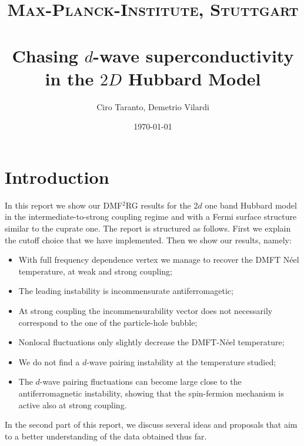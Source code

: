 \documentclass[paper=a4, fontsize=11pt]{scrartcl} %
\title{	
\normalfont \normalsize 
\textsc{Max-Planck-Institute, Stuttgart} \\ [25pt] %
\horrule{0.5pt} \\[0.4cm] %
\huge Chasing $d$-wave superconductivity \\
in the $2D$ Hubbard Model %
\horrule{2pt} \\[0.5cm] %
}
\author{Ciro Taranto, Demetrio Vilardi} %
\date{\normalsize\today} %
\numberwithin{equation}{section} %
\numberwithin{figure}{section} %
\numberwithin{table}{section} %
\begin{document}
\maketitle %


\section{Introduction}
In this report we show our DMF$^2$RG results for the  2$d$ one band Hubbard model in the intermediate-to-strong coupling regime and with a Fermi surface structure similar to the cuprate one. 
The report is structured as follows. 
First we explain the cutoff choice that we have implemented. 
Then we show our results, namely: 
\begin{itemize}
\item With full frequency dependence vertex we manage to recover the DMFT N\' eel temperature, at weak and strong coupling; 
\item The leading instability is incommensurate antiferromagetic; 
\item At strong coupling the incommensurability vector does not necessarily correspond to the one of the particle-hole bubble; 
\item Nonlocal fluctuations only slightly decrease the DMFT-N\' eel temperature; 
\item We do not find a $d$-wave pairing instability at the temperature studied; 
\item The $d$-wave pairing fluctuations can become large close to the antiferromagnetic instability, showing that the spin-fermion mechanism is active also at strong coupling. 
\end{itemize} 
In the second part of this report, we discuss several ideas and proposals that aim to a better understanding of the data obtained thus far. 
\end{document}

